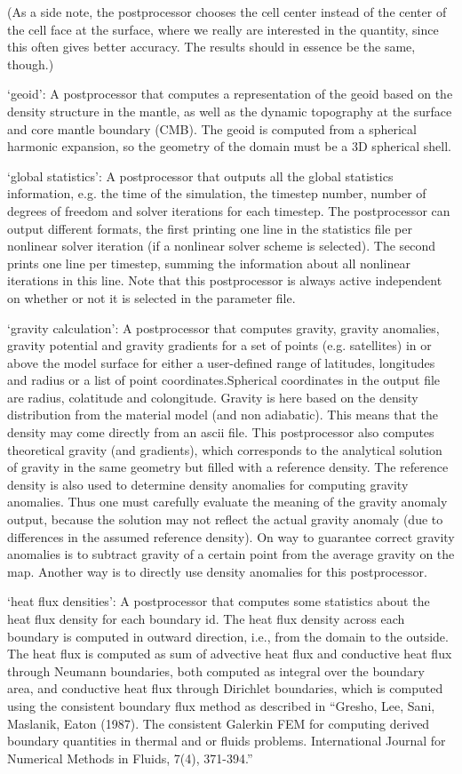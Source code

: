 \begin{itemize}
(As a side note, the postprocessor chooses the cell center instead of the center of the cell face at the surface, where we really are interested in the quantity, since this often gives better accuracy. The results should in essence be the same, though.)

`geoid': A postprocessor that computes a representation of the geoid based on the density structure in the mantle, as well as the dynamic topography at the surface and core mantle boundary (CMB). The geoid is computed from a spherical harmonic expansion, so the geometry of the domain must be a 3D spherical shell.

`global statistics': A postprocessor that outputs all the global statistics information, e.g. the time of the simulation, the timestep number, number of degrees of freedom and solver iterations for each timestep. The postprocessor can output different formats, the first printing one line in the statistics file per nonlinear solver iteration (if a nonlinear solver scheme is selected). The second prints one line per timestep, summing the information about all nonlinear iterations in this line. Note that this postprocessor is always active independent on whether or not it is selected in the parameter file.

`gravity calculation': A postprocessor that computes gravity, gravity anomalies, gravity potential and gravity gradients for a set of points (e.g. satellites) in or above the model surface for either a user-defined range of latitudes, longitudes and radius or a list of point coordinates.Spherical coordinates in the output file are radius, colatitude and colongitude. Gravity is here based on the density distribution from the material model (and non adiabatic). This means that the density may come directly from an ascii file. This postprocessor also computes theoretical gravity (and gradients), which corresponds to the analytical solution of gravity in the same geometry but filled with a reference density. The reference density is also used to determine density anomalies for computing gravity anomalies. Thus one must carefully evaluate the meaning of the gravity anomaly output, because the solution may not reflect the actual gravity anomaly (due to differences in the assumed reference density). On way to guarantee correct gravity anomalies is to subtract gravity of a certain point from the average gravity on the map. Another way is to directly use density anomalies for this postprocessor.

`heat flux densities': A postprocessor that computes some statistics about the heat flux density for each boundary id. The heat flux density across each boundary is computed in outward direction, i.e., from the domain to the outside. The heat flux is computed as sum of advective heat flux and conductive heat flux through Neumann boundaries, both computed as integral over the boundary area, and conductive heat flux through Dirichlet boundaries, which is computed using the consistent boundary flux method as described in ``Gresho, Lee, Sani, Maslanik, Eaton (1987). The consistent Galerkin FEM for computing derived boundary quantities in thermal and or fluids problems. International Journal for Numerical Methods in Fluids, 7(4), 371-394.''


\end{itemize}
